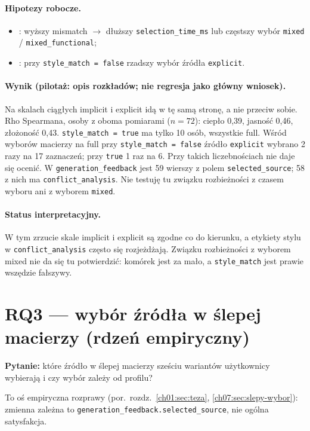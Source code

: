 \paragraph{Hipotezy robocze.}
\begin{itemize}
  \item {}: wyższy mismatch $\rightarrow$ dłuższy \texttt{selection\_time\_ms} lub częstszy wybór \texttt{mixed} / \texttt{mixed\_functional};
  \item {}: przy \texttt{style\_match = false} rzadszy wybór źródła \texttt{explicit}.
\end{itemize}

\paragraph{Wynik (pilotaż: opis rozkładów; nie regresja jako główny wniosek).}
Na skalach ciągłych implicit i explicit idą w tę samą stronę, a nie przeciw sobie. Rho Spearmana, osoby z oboma pomiarami ($n=72$): ciepło 0,39, jasność 0,46, złożoność 0,43.
\texttt{style\_match = true} ma tylko 10 osób, wszystkie full. Wśród wyborów macierzy na full przy \texttt{style\_match = false} źródło \texttt{explicit} wybrano 2 razy na 17 zaznaczeń; przy \texttt{true} 1 raz na 6. Przy takich liczebnościach  nie daje się ocenić. W \texttt{generation\_feedback} jest 59 wierszy z polem \texttt{selected\_source}; 58 z nich ma \texttt{conflict\_analysis}. Nie testuję tu związku rozbieżności z czasem wyboru ani z wyborem \texttt{mixed}.

\paragraph{Status interpretacyjny.}
W tym zrzucie skale implicit i explicit są zgodne co do kierunku, a etykiety stylu w \texttt{conflict\_analysis} często się rozjeżdżają. Związku rozbieżności z wyborem mixed nie da się tu potwierdzić: komórek jest za mało, a \texttt{style\_match} jest prawie wszędzie fałszywy.

\section{RQ3 --- wybór źródła w ślepej macierzy (rdzeń empiryczny)}
\label{ch08:sec:rq3}
\label{ch08:sec:macierz}

\textbf{Pytanie:} które źródło w ślepej macierzy sześciu wariantów użytkownicy wybierają i czy wybór zależy od profilu?

To oś empiryczna rozprawy (por.\ rozdz.~\ref{ch01:sec:teza}, \ref{ch07:sec:slepy-wybor}): zmienna zależna to \texttt{generation\_feedback.selected\_source}, nie ogólna satysfakcja.

